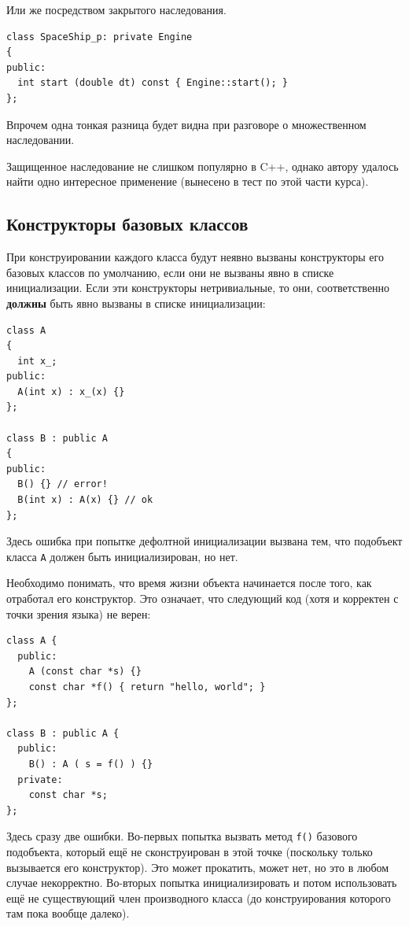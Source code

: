 \documentclass[a4paper,12pt,oneside]{book}
\begin{document}
Или же посредством закрытого наследования.

\begin{lstlisting}
class SpaceShip_p: private Engine
{
public:
  int start (double dt) const { Engine::start(); }
};
\end{lstlisting}

Впрочем одна тонкая разница будет видна при разговоре о множественном наследовании.

Защищенное наследование не слишком популярно в C++, однако автору удалось найти одно интересное применение (вынесено в тест по этой части курса).

\subsection{Конструкторы базовых классов}\label{BaseClassConstr}

При конструировании каждого класса будут неявно вызваны конструкторы его базовых классов по умолчанию, если они не вызваны явно в списке инициализации. Если эти конструкторы нетривиальные, то они, соответственно \textbf{должны} быть явно вызваны в списке инициализации:

\begin{lstlisting}
class A
{
  int x_;
public:
  A(int x) : x_(x) {}
};

class B : public A
{
public:
  B() {} // error!
  B(int x) : A(x) {} // ok
};
\end{lstlisting}

Здесь ошибка при попытке дефолтной инициализации вызвана тем, что подобъект класса \lstinline!A! должен быть инициализирован, но нет.

Необходимо понимать, что время жизни объекта начинается после того, как отработал его конструктор. Это означает, что следующий код (хотя и корректен с точки зрения языка) не верен:

\begin{lstlisting}
class A {
  public:
    A (const char *s) {}
    const char *f() { return "hello, world"; }
};

class B : public A {
  public:
    B() : A ( s = f() ) {}
  private:
    const char *s;
};
\end{lstlisting}

Здесь сразу две ошибки. Во-первых попытка вызвать метод \lstinline!f()! базового подобъекта, который ещё не сконструирован в этой точке (поскольку только вызывается его конструктор). Это может прокатить, может нет, но это в любом случае некорректно. Во-вторых попытка инициализировать и потом использовать ещё не существующий член производного класса (до конструирования которого там пока вообще далеко).
\end{document}
